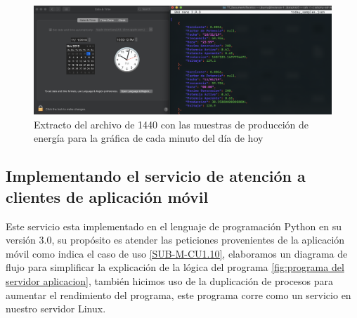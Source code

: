 \begin{figure}[H]
	\centering
	\includegraphics[scale=.3]{Capitulo5/images/today.png}
	\caption{Extracto del archivo de 1440 con las muestras de producción de energía para la gráfica de cada minuto del día de hoy}
	\label{fig:muestras diarias}
\end{figure} 

\subsection{Implementando el servicio de atención a clientes de aplicación móvil}

Este servicio esta implementado en el lenguaje de programación Python en su versión 3.0, su propósito es atender las peticiones provenientes de la aplicación móvil como indica el caso de uso \ref{SUB-M-CU1.10}, elaboramos un diagrama de flujo para simplificar la explicación de la lógica del programa \ref{fig:programa del servidor aplicacion}, también hicimos uso de la duplicación de procesos para aumentar el rendimiento del programa, este programa corre como un servicio en nuestro servidor Linux.

